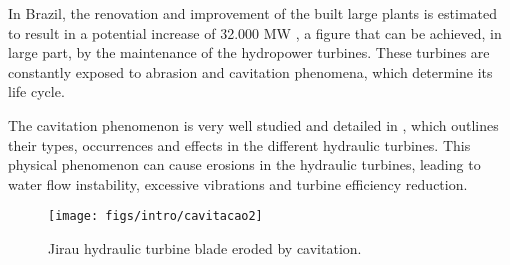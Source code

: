 
In Brazil, the renovation and improvement of the built large plants is estimated
to result in a potential increase of 32.000 MW \citep{goldemberg2007energia}, a
figure that can be achieved, in large part, by the maintenance of the
hydropower turbines. These turbines are constantly exposed to abrasion and
cavitation phenomena, which determine its life cycle.

The cavitation phenomenon is very well studied and detailed in
\cite{escaler2006detection}, which outlines their types, occurrences and
effects in the different hydraulic turbines. This physical phenomenon can cause
erosions in the hydraulic turbines, leading to water flow instability,
excessive vibrations and turbine efficiency reduction.

\begin{figure}[h!]	
	\texttt{[image: figs/intro/cavitacao2]}
	\caption{Jirau hydraulic turbine blade eroded by cavitation.}
	\label{fig::cavitacao}
\end{figure}

